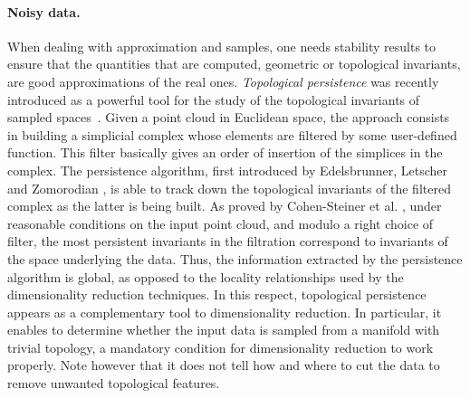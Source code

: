 




\paragraph{Noisy data.} 
When dealing with approximation and samples, one needs stability results to ensure that the quantities that are computed, geometric or topological invariants, are good approximations of the real ones. {\em Topological persistence} was recently introduced as a powerful tool for the study of the topological invariants of sampled spaces~\cite{eh-ph-2008,rg-bptd-2008}. Given a point cloud in Euclidean space, the approach consists in building a simplicial complex whose elements are filtered by some user-defined function. This filter basically gives an order of insertion of the simplices in the complex. The persistence algorithm, first introduced by Edelsbrunner, Letscher and Zomorodian \cite{elz-tps-2002}, is able to track down the topological invariants of the filtered complex as the latter is being built. As proved by Cohen-Steiner et al. \cite{geometrica-cseh-07}, under reasonable conditions on the input point cloud, and modulo a right choice of filter, the most persistent invariants in the filtration correspond to invariants of the space underlying the data. Thus, the information extracted by the persistence algorithm is global, as opposed to the locality relationships used by the dimensionality reduction techniques. In this respect, topological persistence appears as a complementary tool to dimensionality reduction. In particular, it enables to determine whether the input data is sampled from a manifold with trivial topology, a mandatory condition for dimensionality reduction to work properly. Note however that it does not tell how and where to cut the data to remove unwanted topological features.

